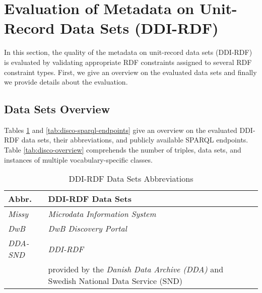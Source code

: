 \documentclass{llncs}
\begin{document}
\section{Evaluation of Metadata on Unit-Record Data Sets (DDI-RDF)}

In this section, the quality of the metadata on unit-record data sets (DDI-RDF) is evaluated by validating appropriate RDF constraints assigned to several RDF constraint types.
First, we give an overview on the evaluated data sets and finally we provide details about the evaluation.

\subsection{Data Sets Overview}

Tables \ref{tab:disco-data-sets-abbreviations} and \ref{tab:disco-sparql-endpoints} give an overview on the evaluated DDI-RDF data sets, their abbreviations, and publicly available SPARQL endpoints.
Table \ref{tab:disco-overview} comprehends the number of triples, data sets, and instances of multiple vocabulary-specific classes.

\begin{table}[H]
	\centering
		\begin{tabular}{l|l}
      \textbf{Abbr.} & \textbf{DDI-RDF Data Sets} \\		
      \hline
    \emph{Missy} & \emph{Microdata Information System}\tablefootnote{\url{http://www.gesis.org/missy/eu/missy-home}} \\
		\emph{DwB} & \emph{DwB Discovery Portal}\tablefootnote{\url{http://dwb-dev.nsd.uib.no/portal}} \\
		\emph{DDA-SND} & \emph{DDI-RDF}\tablefootnote{\url{http://ddi-rdf.borsna.se/}} \\
		               & provided by the \emph{Danish Data Archive (DDA)}\tablefootnote{\url{http://samfund.dda.dk/dda/default-en.asp}} and Swedish National Data Service (SND)\tablefootnote{\url{http://snd.gu.se/en}} \\ 
		\end{tabular}
	\caption{DDI-RDF Data Sets Abbreviations}
	\label{tab:disco-data-sets-abbreviations}
\end{table}
\end{document}
